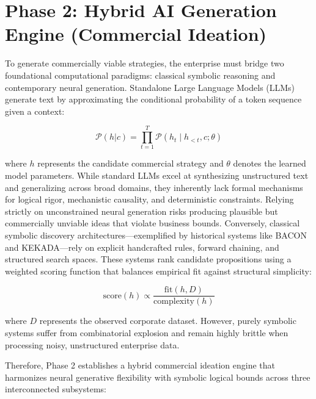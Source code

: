 \documentclass[11pt, a4paper]{article}
\begin{document}
\section{Phase 2: Hybrid AI Generation Engine (Commercial Ideation)}

To generate commercially viable strategies, the enterprise must bridge two foundational computational paradigms: classical symbolic reasoning and contemporary neural generation. Standalone Large Language Models (LLMs) generate text by approximating the conditional probability of a token sequence given a context:

\[
\mathcal{P}(h|c) = \prod_{t=1}^{T} \mathcal{P}(h_{t} \mid h_{<t}, c; \theta)
\]

where $h$ represents the candidate commercial strategy and $\theta$ denotes the learned model parameters. While standard LLMs excel at synthesizing unstructured text and generalizing across broad domains, they inherently lack formal mechanisms for logical rigor, mechanistic causality, and deterministic constraints. Relying strictly on unconstrained neural generation risks producing plausible but commercially unviable ideas that violate business bounds. Conversely, classical symbolic discovery architectures---exemplified by historical systems like BACON and KEKADA---rely on explicit handcrafted rules, forward chaining, and structured search spaces. These systems rank candidate propositions using a weighted scoring function that balances empirical fit against structural simplicity:

\[
\text{score}(h) \propto \frac{\text{fit}(h, D)}{\text{complexity}(h)}
\]

where $D$ represents the observed corporate dataset. However, purely symbolic systems suffer from combinatorial explosion and remain highly brittle when processing noisy, unstructured enterprise data.

Therefore, Phase 2 establishes a hybrid commercial ideation engine that harmonizes neural generative flexibility with symbolic logical bounds across three interconnected subsystems:
\end{document}
